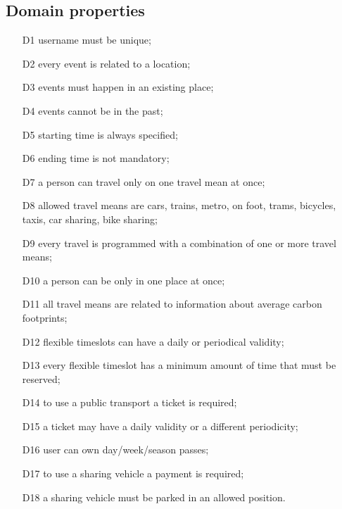 \subsection{Domain properties}

\begin{itemize}
\item[D1] username must be unique;
\item[D2] every event is related to a location;
\item[D3] events must happen in an existing place;
\item[D4] events cannot be in the past;
\item[D5] starting time is always specified;
\item[D6] ending time is not mandatory;
\item[D7] a person can travel only on one travel mean at once; 
\item[D8] allowed travel means are cars, trains, metro, on foot, trams, bicycles, taxis, car sharing, bike sharing;
\item[D9] every travel is programmed with a combination of one or more travel means;
\item[D10] a person can be only in one place at once;
\item[D11] all travel means are related to information about average carbon footprints; 
\item[D12] flexible timeslots can have a daily or periodical validity;
\item[D13] every flexible timeslot has a minimum amount of time that must be reserved;
\item[D14] to use a public transport a ticket is required; 
\item[D15] a ticket may have a daily validity or a different periodicity; 
\item[D16] user can own day/week/season passes;
\item[D17] to use a sharing vehicle a payment is required;
\item[D18] a sharing vehicle must be parked in an allowed position.
\end{itemize}
